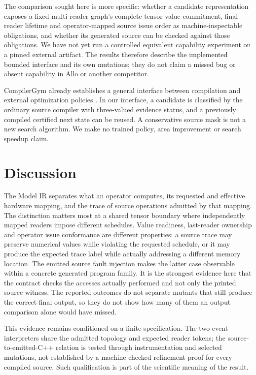 \documentclass{article}
\begin{document}
The comparison sought here is more specific: whether a candidate representation exposes a fixed multi-reader graph's complete tensor value commitment, final reader lifetime and operator-mapped source issue order as machine-inspectable obligations, and whether its generated source can be checked against those obligations. We have not yet run a controlled equivalent capability experiment on a pinned external artifact. The results therefore describe the implemented bounded interface and its own mutations; they do not claim a missed bug or absent capability in Allo or another competitor.


CompilerGym already establishes a general interface between compilation and external optimization policies \cite{compilergym2022}. In our interface, a candidate is classified by the ordinary source compiler with three-valued evidence status, and a previously compiled certified next state can be reused. A conservative source mask is not a new search algorithm. We make no trained policy, area improvement or search speedup claim.

\section{Discussion}
\label{sec:discussion}

The Model IR separates what an operator computes, its requested and effective hardware mapping, and the trace of source operations admitted by that mapping. The distinction matters most at a shared tensor boundary where independently mapped readers impose different schedules. Value readiness, last-reader ownership and operator issue conformance are different properties: a source trace may preserve numerical values while violating the requested schedule, or it may produce the expected trace label while actually addressing a different memory location. The emitted source fault injection makes the latter case observable within a concrete generated program family. It is the strongest evidence here that the contract checks the accesses actually performed and not only the printed source witness. The reported outcomes do not separate mutants that still produce the correct final output, so they do not show how many of them an output comparison alone would have missed.

This evidence remains conditioned on a finite specification. The two event interpreters share the admitted topology and expected reader tokens; the source-to-emitted-C++ relation is tested through instrumentation and selected mutations, not established by a machine-checked refinement proof for every compiled source. Such qualification is part of the scientific meaning of the result.
\end{document}
